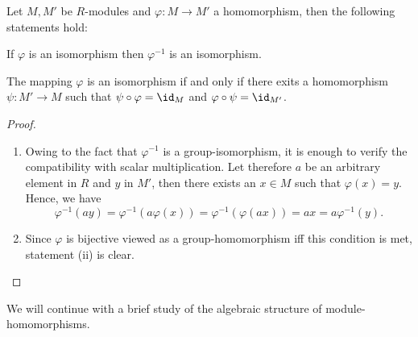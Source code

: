 \begin{lemma}
Let $M,M'$ be $R$-modules and $\varphi\colon M\rightarrow M'$ a homomorphism, then the following statements hold:
\begin{exlist}
\item If $\varphi$ is an isomorphism then $\varphi^{-1}$ is an isomorphism.
\item The mapping $\varphi$ is an isomorphism if and only if there exits a homomorphism $\psi\colon M'\rightarrow M$ such that $\psi\circ\varphi=\id_M$ and $\varphi\circ\psi=\id_{M'}$.
\end{exlist}
\end{lemma}
\begin{proof}
\begin{enumerate}
\item Owing to the fact that $\varphi^{-1}$ is a group-isomorphism, it is enough to verify the compatibility with scalar multiplication. Let therefore $a$ be an arbitrary element in $R$ and $y$ in $M'$, then there exists an $x\in M$ such that $\varphi(x)=y$. Hence, we have
\begin{equation*}
\varphi^{-1}(ay)=\varphi^{-1}(a\varphi(x))=\varphi^{-1}(\varphi(ax))=ax=a\varphi^{-1}(y).
\end{equation*}
\item Since $\varphi$ is bijective viewed as a group-homomorphism iff this condition is met, statement (ii) is clear.
\end{enumerate}
\end{proof}

We will continue with a brief study of the algebraic structure of module-homomorphisms.

